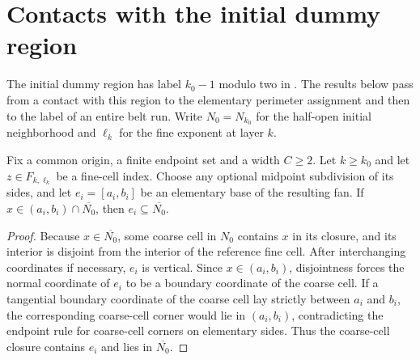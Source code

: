 \section{Contacts with the initial dummy region}
\label{sec:area_law_dummy_run_interfaces}

The initial dummy region has label $k_0-1$ modulo two in
\cite[Section~11]{OpenAI2026AreaLaw}. The results below pass from
a contact with this region to the elementary perimeter assignment and
then to the label of an entire belt run. Write $N_0=N_{k_0}$ for the
half-open initial neighborhood and $\ell_k$ for the fine exponent at
layer $k$.


\begin{lemma}
    \label{thm:area_law_elementary_open_dummy_contact}
    \leanok
    Fix a common origin, a finite endpoint set and a width $C\ge 2$.
    Let $k\ge k_0$ and let $z\in F_{k,\ell_k}$ be a fine-cell index.
    Choose any optional midpoint subdivision of its sides, and let
    $e_i=[a_i,b_i]$ be an elementary base of the resulting fan.
    If $x\in(a_i,b_i)\cap\overline{N_0}$, then
    $e_i\subseteq\overline{N_0}$.
\end{lemma}
\begin{proof}\leanok
    Because $x\in\overline{N_0}$, some coarse cell in $N_0$ contains $x$ in its closure, and its interior is
    disjoint from the interior of the reference fine cell. After
    interchanging coordinates if necessary, $e_i$ is vertical. Since
    $x\in(a_i,b_i)$, disjointness forces the normal coordinate of $e_i$
    to be a boundary coordinate of the coarse cell. If a tangential
    boundary coordinate of the coarse cell lay strictly between $a_i$
    and $b_i$, the corresponding coarse-cell corner would lie in
    $(a_i,b_i)$, contradicting the endpoint rule for coarse-cell corners on
    elementary sides. Thus the
    coarse-cell closure contains $e_i$ and lies in $\overline{N_0}$.
\end{proof}

